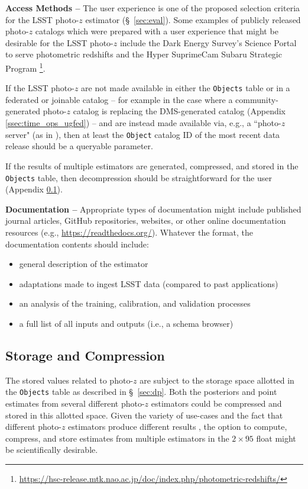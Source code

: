 \documentclass[DM,authoryear,toc]{lsstdoc}
\begin{document}
{\bf Access Methods --} 
The user experience is one of the proposed selection criteria for the LSST photo-$z$ estimator (\S~\ref{sec:eval}). 
Some examples of publicly released photo-$z$ catalogs which were prepared with a user experience that might be desirable for the LSST photo-$z$ include the Dark Energy Survey's Science Portal to serve photometric redshifts \cite{2018A&C....25...58G} and the Hyper SuprimeCam Subaru Strategic Program \cite{2018PASJ...70S...9T}\footnote{\url{https://hsc-release.mtk.nao.ac.jp/doc/index.php/photometric-redshifts/}}.

If the LSST photo-$z$ are not made available in either the {\tt Objects} table or in a federated or joinable catalog -- for example in the case where a community-generated photo-$z$ catalog is replacing the DMS-generated catalog (Appendix \ref{ssec:time_ops_ugfed}) -- and are instead made available via, e.g., a ``photo-$z$ server" (as in \cite{2018A&C....25...58G}), then at least the {\tt Object} catalog ID of the most recent data release should be a queryable parameter.

If the results of multiple estimators are generated, compressed, and stored in the {\tt Objects} table, then decompression should be straightforward for the user (Appendix \ref{ssec:dp_store}).

{\bf Documentation --} 
Appropriate types of documentation might include published journal articles, GitHub repositories, websites, or other online documentation resources (e.g., \url{https://readthedocs.org/}). Whatever the format, the documentation contents should include: 
\vspace{-15pt}
\begin{itemize}
\item general description of the estimator
\item adaptations made to ingest LSST data (compared to past applications)
\item an analysis of the training, calibration, and validation processes
\item a full list of all inputs and outputs (i.e., a schema browser)
\end{itemize}

\subsection{Storage and Compression}\label{ssec:dp_store}

The stored values related to photo-$z$ are subject to the storage space allotted in the {\tt Objects} table as described in \S~\ref{sec:dp}.
Both the posteriors and point estimates from several different photo-$z$ estimators could be compressed and stored in this allotted space.
Given the variety of use-cases and the fact that different photo-$z$ estimators produce different results \citep{2020MNRAS.499.1587S}, the option to compute, compress, and store estimates from multiple estimators in the $2\times95$ float might be scientifically desirable.
\end{document}
